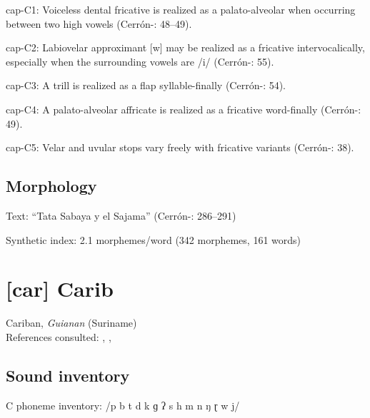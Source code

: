 {\begin{appendixdesc}
\item[cap-C1:] Voiceless dental fricative is realized as a palato-alveolar when occurring between two high vowels (Cerrón-\citealt{Palomino2006}: 48--49).

\item[cap-C2:] Labiovelar approximant [w] may be realized as a fricative intervocalically, especially when the surrounding vowels are /i/ (Cerrón-\citealt{Palomino2006}: 55).

\item[cap-C3:] A trill is realized as a flap syllable-finally (Cerrón-\citealt{Palomino2006}: 54).

\item[cap-C4:] A palato-alveolar affricate is realized as a fricative word-finally (Cerrón-\citealt{Palomino2006}: 49).

\item[cap-C5:] Velar and uvular stops vary freely with fricative variants (Cerrón-\citealt{Palomino2006}: 38).
\end{appendixdesc}
\subsection*{Morphology}

\begin{appendixdesc}

\item[Text:] “Tata Sabaya y el Sajama” (Cerrón-\citealt{Palomino2006}: 286--291)

\item[Synthetic index:] 2.1 morphemes/word (342 morphemes, 161 words)
\end{appendixdesc}
\section*{[car] Carib}   %
Cariban, \textit{Guianan} (Suriname)\medskip\\
References consulted: \citet{Courtz2008}, \citet{Hoff1968}, \citet{Peasgood1972}

\subsection*{Sound inventory}
\begin{appendixdesc}

\item[C phoneme inventory:] /p b t d k ɡ ʔ s h m n ŋ ɽ w j/


\end{appendixdesc}}
